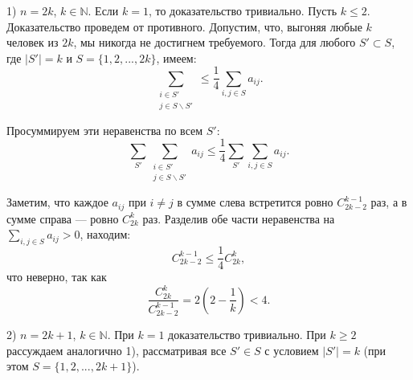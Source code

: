 \documentclass[12pt, a4paper]{article}
\begin{document}
\begin{enumerate}
1) $n = 2k$, $k \in \mathbb{N}$. Если $k = 1$, то доказательство тривиально. Пусть $k \leqslant 2$. Доказательство проведем от противного. Допустим, что, выгоняя любые $k$ человек из $2k$, мы никогда не достигнем требуемого. Тогда для любого $S' \subset S$, где $|S'| = k$ и $S = \{1, 2, ..., 2k \}$, имеем:
$$\sum_{\substack{i \in S' \\ j \in S \backslash S'}} \leqslant \frac{1}{4} \sum_{i, j \in S} a_{ij}.$$

Просуммируем эти неравенства по всем $S'$:
$$\sum_{S'} \sum_{\substack{i \in S' \\ j \in S \backslash S'}} a_{ij} \leqslant \frac{1}{4} \sum_{S'} \sum_{i, j \in S} a_{ij}.$$

Заметим, что каждое $a_{ij}$ при $i \neq j$ в сумме слева встретится ровно $C_{2k-2}^{k-1}$ раз, а в сумме справа --- ровно $C_{2k}^{k}$ раз. Разделив обе части неравенства на $\sum_{i, j \in S} a_{ij} > 0$, находим:
$$ C_{2k-2}^{k-1} \leqslant \frac{1}{4} C_{2k}^k,$$
что неверно, так как 
$$\frac{C_{2k}^{k}}{C_{2k-2}^{k-1}} = 2 \left( 2 - \frac{1}{k} \right) < 4.$$

2) $n = 2k + 1$, $k \in \mathbb{N}$. При $k = 1$ доказательство тривиально. При $k \geqslant 2$ рассуждаем аналогично 1), рассматривая все $S' \in S$ с условием $|S'| = k$ (при этом $S = \{1, 2, ..., 2k+1\}$).

\end{enumerate}
\end{document}
